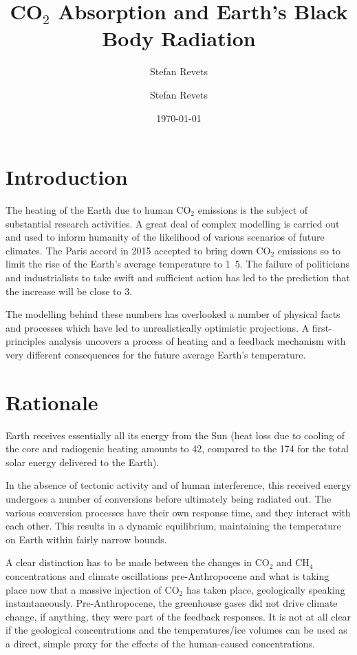 \documentclass[10pt,a4paper,titlepage]{article}
\author{Stefan Revets}
\author{Stefan Revets}
\date{\today}
\title{CO$_{\text{2}}$ Absorption and Earth's Black Body Radiation}
\begin{document}
\maketitle
\tableofcontents


\section{Introduction}
\label{sec-1}
The heating of the Earth due to human CO$_{\text{2}}$ emissions is the subject
of substantial research activities. A great deal of complex modelling
is carried out and used to inform humanity of the likelihood of
various scenarios of future climates. The Paris accord in 2015
accepted to bring down CO$_{\text{2}}$ emissions so to limit the rise of the
Earth's average temperature to \unit{1.5}{\celsius}. The
failure of politicians and industrialists to take swift and sufficient
action has led to the prediction that the increase will be close to
\unit{3}{\celsius}.

The modelling behind these numbers has overlooked a number of physical
facts and processes which have led to unrealistically optimistic
projections. A first-principles analysis uncovers a process of heating
and a feedback mechanism with very different consequences for the
future average Earth's temperature.

\section{Rationale}
\label{sec-2}
Earth receives essentially all its energy from the Sun (heat loss due
to cooling of the core and radiogenic heating amounts to
\unit{42}{\terad\watt}, compared to the \unit{174}{\petad\watt}
for the total solar energy delivered to the Earth). 

In the absence of tectonic activity and of human interference, this
received energy undergoes a number of conversions before ultimately
being radiated out. The various conversion processes have their own
response time, and they interact with each other. This results in a
dynamic equilibrium, maintaining the temperature on Earth within
fairly narrow bounds.

A clear distinction has to be made between the changes in CO$_{\text{2}}$ and
CH$_{\text{4}}$ concentrations and climate oscillations pre-Anthropocene and
what is taking place now that a massive injection of CO$_{\text{2}}$ has taken
place, geologically speaking instantaneously. Pre-Anthropocene, the
greenhouse gases did not drive climate change, if anything, they were
part of the feedback responses. It is not at all clear if the
geological concentrations and the temperatures/ice volumes can be used
as a direct, simple proxy for the effects of the human-caused
concentrations.
\end{document}
